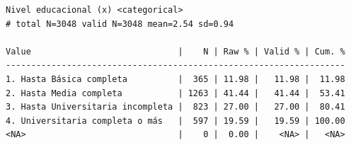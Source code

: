 \documentclass[
  letterpaper,
  DIV=11,
  numbers=noendperiod]{scrreprt}
\newenvironment{Shaded}{\begin{snugshade}}{\end{snugshade}}
\newcommand{\AttributeTok}[1]{\textcolor[rgb]{0.40,0.45,0.13}{#1}}
\newcommand{\ConstantTok}[1]{\textcolor[rgb]{0.56,0.35,0.01}{#1}}
\newcommand{\DecValTok}[1]{\textcolor[rgb]{0.68,0.00,0.00}{#1}}
\newcommand{\FunctionTok}[1]{\textcolor[rgb]{0.28,0.35,0.67}{#1}}
\newcommand{\NormalTok}[1]{\textcolor[rgb]{0.00,0.23,0.31}{#1}}
\newcommand{\OtherTok}[1]{\textcolor[rgb]{0.00,0.23,0.31}{#1}}
\newcommand{\SpecialCharTok}[1]{\textcolor[rgb]{0.37,0.37,0.37}{#1}}
\newcommand{\StringTok}[1]{\textcolor[rgb]{0.13,0.47,0.30}{#1}}
\begin{document}
\begin{Shaded}
\end{Shaded}

\begin{verbatim}
Nivel educacional (x) <categorical> 
# total N=3048 valid N=3048 mean=2.54 sd=0.94

Value                             |    N | Raw % | Valid % | Cum. %
-------------------------------------------------------------------
1. Hasta Básica completa          |  365 | 11.98 |   11.98 |  11.98
2. Hasta Media completa           | 1263 | 41.44 |   41.44 |  53.41
3. Hasta Universitaria incompleta |  823 | 27.00 |   27.00 |  80.41
4. Universitaria completa o más   |  597 | 19.59 |   19.59 | 100.00
<NA>                              |    0 |  0.00 |    <NA> |   <NA>
\end{verbatim}
\end{document}
